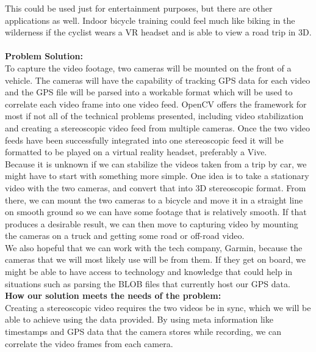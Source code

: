 \documentclass[10pt,draftclsnofoot,onecolumn]{IEEEtran}
\begin{document}
This could be used just for entertainment purposes, but there are other applications as well. Indoor bicycle training could feel much like biking in the wilderness if the cyclist wears a VR headset and is able to view a road trip in 3D. \\

\\

{\Medium\textbf{Problem Solution:}}\\


To capture the video footage, two cameras will be mounted on the front of a vehicle. The cameras will have the capability of tracking GPS data for each video and the GPS file will be parsed into a workable format which will be used to correlate each video frame into one video feed. OpenCV offers the framework for most if not all of the technical problems presented, including video stabilization and creating a stereoscopic video feed from multiple cameras. Once the two video feeds have been successfully integrated into one stereoscopic feed it will be formatted to be played on a virtual reality headset, preferably a Vive.
 \\


Because it is unknown if we can stabilize the videos taken from a trip by car, we might have to start with something more simple. One idea is to take a stationary video with the two cameras, and convert that into 3D stereoscopic format. From there, we can mount the two cameras to a bicycle and move it in a straight line on smooth ground so we can have some footage that is relatively smooth. If that produces a desirable result, we can then move to capturing video by mounting the cameras on a truck and getting some road or off-road video.\\
 


We also hopeful that we can work with the tech company, Garmin, because the cameras that we will most likely use will be from them. If they get on board, we might be able to have access to technology and knowledge that could help in situations such as parsing the BLOB files that currently host our GPS data.
 \\ 

{\Medium\textbf{How our solution meets the needs of the problem:}}\\

Creating a stereoscopic video requires the two videos be in sync, which we will be able to achieve using the data provided. By using meta information like timestamps and GPS data that the camera stores while recording, we can correlate the video frames from each camera. \\
\end{document}
